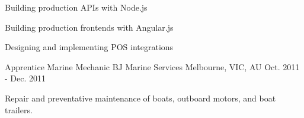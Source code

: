 \begin{cventries}
{\begin{cvitems}
        \item {Building production APIs with Node.js}
        \item {Building production frontends with Angular.js}
        \item {Designing and implementing POS integrations}
      \end{cvitems}
    }
  \cventry
    {Apprentice Marine Mechanic}
    {BJ Marine Services}
    {Melbourne, VIC, AU}
    {Oct. 2011 - Dec. 2011}
    {
      \begin{cvitems}
        \item {Repair and preventative maintenance of  boats, outboard motors, and boat trailers.}
      \end{cvitems}
    }


\end{cventries}
